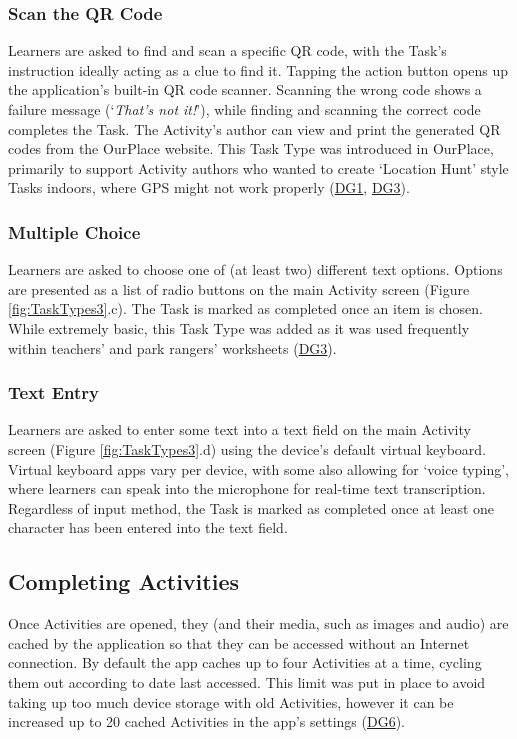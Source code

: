 \subsubsection*{Scan the QR Code}
Learners are asked to find and scan a specific QR code, with the Task's instruction ideally acting as a clue to find it. Tapping the action button opens up the application's built-in QR code scanner. Scanning the wrong code shows a failure message (`\textit{That's not it!}'), while finding and scanning the correct code completes the Task. The Activity's author can view and print the generated QR codes from the OurPlace website. This Task Type was introduced in OurPlace, primarily to support Activity authors who wanted to create `Location Hunt' style Tasks indoors, where GPS might not work properly (\hyperref[DG1]{DG1}, \hyperref[DG3]{DG3}).

\subsubsection*{Multiple Choice}
Learners are asked to choose one of (at least two) different text options. Options are presented as a list of radio buttons on the main Activity screen (Figure \ref{fig:TaskTypes3}.c). The Task is marked as completed once an item is chosen. While extremely basic, this Task Type was added as it was used frequently within teachers' and park rangers' worksheets (\hyperref[DG3]{DG3}).

\subsubsection*{Text Entry}
Learners are asked to enter some text into a text field on the main Activity screen (Figure \ref{fig:TaskTypes3}.d) using the device's default virtual keyboard. Virtual keyboard apps vary per device, with some also allowing for `voice typing', where learners can speak into the microphone for real-time text transcription. Regardless of input method, the Task is marked as completed once at least one character has been entered into the text field. 

\subsection{Completing Activities}

Once Activities are opened, they (and their media, such as images and audio) are cached by the application so that they can be accessed without an Internet connection. By default the app caches up to four Activities at a time, cycling them out according to date last accessed. This limit was put in place to avoid taking up too much device storage with old Activities, however it can be increased up to 20 cached Activities in the app's settings (\hyperref[DG6]{DG6}).

